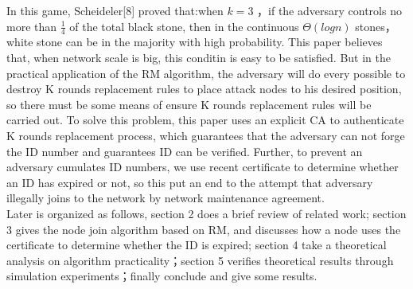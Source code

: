 \documentclass[10pt]{article}
\begin{document}
    In this game, Scheideler[8] proved that:when \(k=3\)  ，if the adversary controls no more than $\frac{1}{4}$ of the total black stone, then in the continuous \(\Theta(log n) \) stones，white stone can be in the majority with high probability. This paper believes that, when network scale is big, this conditin is easy to be satisfied. But in the practical application of the RM algorithm, the adversary will do every possible to destroy K rounds replacement rules to place attack nodes to his desired position, so there must be some means of ensure K rounds replacement rules will be carried out. To solve this problem, this paper uses an explicit CA to authenticate K rounds replacement process, which guarantees that the adversary can not forge the ID number and guarantees ID can be verified. Further, to prevent an adversary cumulates ID numbers, we use recent certificate to determine whether an ID has expired or not, so this put an end to the attempt that adversary illegally joins to the network by network maintenance agreement. \\
    Later is organized as follows, section 2 does a brief review of related work; section 3 gives the node join algorithm based on RM, and discusses how a node uses the certificate to determine whether the ID is expired; section 4 take a theoretical analysis on algorithm practicality；section 5 verifies theoretical results through simulation experiments；finally conclude and give some results.
\end{document}

